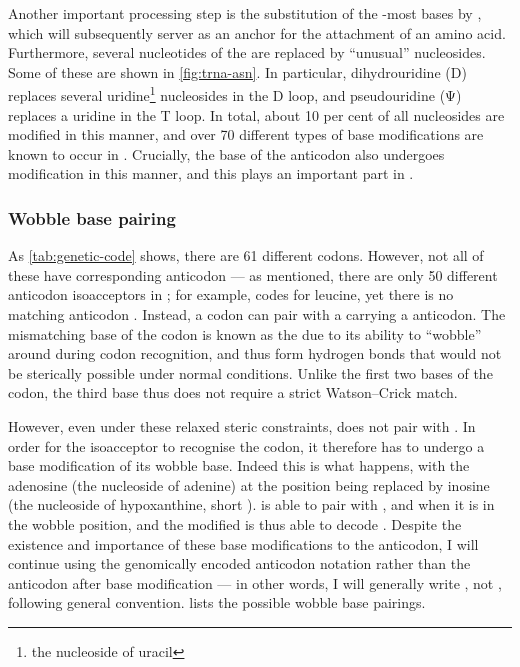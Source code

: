 Another important processing step is the substitution of the \threep-most bases
by , which will subsequently server as an anchor for the
attachment of an amino acid. Furthermore, several nucleotides of the \trna are
replaced by “unusual” nucleosides. Some of these are shown in
\cref{fig:trna-asn}. In particular, dihydrouridine (\seq D) replaces several
uridine\footnote{the nucleoside of uracil} nucleosides in the D loop, and
pseudouridine (\seq Ψ) replaces a uridine in the T loop. In total, about
\num{10} per cent of all nucleosides are modified in this manner, and over
\num{70} different types of base modifications are known to occur in \trna
\citep{Limbach:1994,Dalluge:1997,Alberts:2002}. Crucially, the \fivep base of
the anticodon also undergoes modification in this manner, and this plays an
important part in .

\subsubsection{Wobble base pairing}

As \cref{tab:genetic-code} shows, there are \num{61} different codons. However,
not all of these have corresponding anticodon \trna[s] --- as mentioned, there
are only \num{50} different anticodon isoacceptors in \mmu; for example,
 codes for leucine, yet there is no matching 
anticodon \trna. Instead, a  codon can pair with a \trna carrying a
 anticodon. The mismatching \threep base of the codon is known as
the  due to its ability to “wobble” around during codon
recognition, and thus form hydrogen bonds that would not be sterically possible
under normal conditions. Unlike the first two bases of the codon, the third base
thus does not require a strict Watson--Crick match.

However, even under these relaxed steric constraints, \nA does not pair with
\nC. In order for the  isoacceptor \trna[s] to recognise the
 codon, it therefore has to undergo a base modification of its wobble
base. Indeed this is what happens, with the adenosine (the nucleoside of
adenine) at the \fivep position being replaced by inosine (the nucleoside of
hypoxanthine, short \nI). \nI is able to pair with \nA, \nC and \nU when it is
in the wobble position, and the modified  is thus able to decode
 \citep{Crick:1966,Murphy:2004}. Despite the existence and importance
of these base modifications to the anticodon, I will continue using the
genomically encoded anticodon notation rather than the anticodon after base
modification --- in other words, I will generally write , not
, following general convention.  lists the
possible wobble base pairings.

